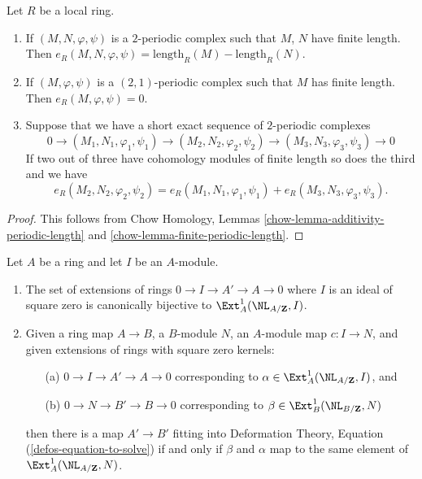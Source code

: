 \begin{lemma}
\label{lemma-periodic-length}
Let $R$ be a local ring.
\begin{enumerate}
\item If $(M, N, \varphi, \psi)$ is a $2$-periodic complex
such that $M$, $N$ have finite length. Then
$e_R(M, N, \varphi, \psi) = \text{length}_R(M) - \text{length}_R(N)$.
\item If $(M, \varphi, \psi)$ is a $(2, 1)$-periodic complex
such that $M$ has finite length. Then
$e_R(M, \varphi, \psi) = 0$.
\item Suppose that we have a short exact sequence of
$2$-periodic complexes
$$
0 \to (M_1, N_1, \varphi_1, \psi_1)
\to (M_2, N_2, \varphi_2, \psi_2)
\to (M_3, N_3, \varphi_3, \psi_3)
\to 0
$$
If two out of three have cohomology modules of finite length so does
the third and we have
$$
e_R(M_2, N_2, \varphi_2, \psi_2) =
e_R(M_1, N_1, \varphi_1, \psi_1) +
e_R(M_3, N_3, \varphi_3, \psi_3).
$$
\end{enumerate}
\end{lemma}

\begin{proof}
This follows from Chow Homology, Lemmas
\ref{chow-lemma-additivity-periodic-length} and
\ref{chow-lemma-finite-periodic-length}.
\end{proof}


\begin{lemma}
\label{lemma-extensions-of-rings}
Let $A$ be a ring and let $I$ be an $A$-module.
\begin{enumerate}
\item The set of extensions of rings $0 \to I \to A' \to A \to 0$
where $I$ is an ideal of square zero is canonically bijective to
$\Ext^1_A(\NL_{A/\mathbf{Z}}, I)$.
\item Given a ring map $A \to B$, a $B$-module $N$, an $A$-module
map $c : I \to N$, and given extensions of rings with square zero kernels:
\begin{enumerate}
\item[(a)] $0 \to I \to A' \to A \to 0$ corresponding to
$\alpha \in \Ext^1_A(\NL_{A/\mathbf{Z}}, I)$, and
\item[(b)] $0 \to N \to B' \to B \to 0$ corresponding to
$\beta \in \Ext^1_B(\NL_{B/\mathbf{Z}}, N)$
\end{enumerate}
then there is a map $A' \to B'$ fitting into
Deformation Theory, Equation (\ref{defos-equation-to-solve})
if and only if $\beta$ and $\alpha$
map to the same element of
$\Ext^1_A(\NL_{A/\mathbf{Z}}, N)$.
\end{enumerate}
\end{lemma}

